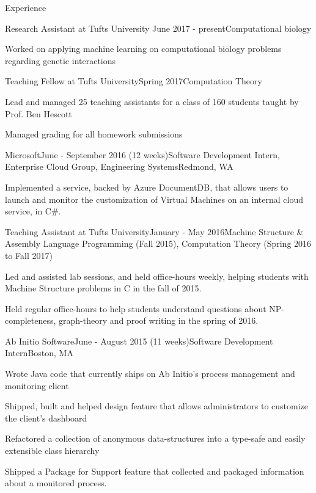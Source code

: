 \documentclass{resume}
\begin{document}
  \begin{rSection}{Experience}
    \begin{rSubsection}{Research Assistant at Tufts University} {June 2017 - present}{Computational biology}{}
    \item Worked on applying machine learning on computational biology problems regarding genetic interactions
    \end{rSubsection}

    \begin{rSubsection}{Teaching Fellow at Tufts University}{Spring 2017}{Computation Theory}{}
    \item Lead and managed 25 teaching assistants for a class of 160 students taught by Prof. Ben Hescott
    \item Managed grading for all homework submissions
    \end{rSubsection}
  
    \begin{rSubsection}{Microsoft}{June - September 2016 (12 weeks)}{Software Development Intern, Enterprise Cloud Group, Engineering Systems}{Redmond, WA}
    \item Implemented a service, backed by Azure DocumentDB, that allows users to launch and monitor the customization of Virtual Machines on an internal cloud service, in C\#.
    \end{rSubsection}

    \begin{rSubsection}{Teaching Assistant at Tufts University}{January - May 2016}{Machine Structure \& Assembly Language Programming (Fall 2015), Computation Theory (Spring 2016 to Fall 2017)}{}
    \item Led and assisted lab sessions, and held office-hours weekly, helping students with Machine Structure problems in C in the fall of 2015.
    \item Held regular office-hours to help students understand questions about NP-completeness, graph-theory and proof writing in the spring of 2016.
    \end{rSubsection}
  
    \begin{rSubsection}{Ab Initio Software}{June - August 2015 (11 weeks)}{Software Development Intern}{Boston, MA}
    \item Wrote Java code that currently ships on Ab Initio's process management and monitoring client
    \item Shipped, built and helped design feature that allows administrators to customize the client’s dashboard
    \item Refactored a collection of anonymous data-structures into a type-safe and easily extensible class hierarchy
    \item Shipped a Package for Support feature that collected and packaged information about a monitored process.
    \end{rSubsection}


\end{rSection}
\end{document}

